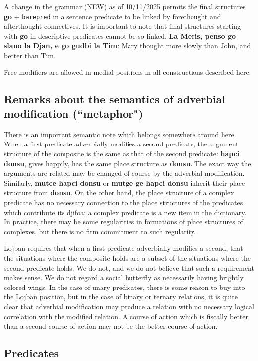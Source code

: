 \documentclass[12pt]{book}
\begin{document}
A change in the grammar (NEW) as of 10/11/2025 permits the final structures {\bf go} + {\tt barepred} in a sentence predicate to be linked by forethought and afterthought connectives.  It is important to note that final structures starting with {\bf go} in descriptive predicates cannot be so linked.  {\bf La Meris, penso go slano la Djan, e go gudbi la Tim}:  Mary thought more slowly than John, and better than Tim.

Free modifiers are allowed in medial positions in all constructions described here.

\subsection{Remarks about the semantics of adverbial modification (``metaphor")}

There is an important semantic note which belongs somewhere around here.  When a first predicate adverbially modifies a second predicate, the argument structure of the composite is the same as that of the second predicate:  {\bf hapci donsu}, gives happily, has the same place structure as {\bf donsu}.  The exact way the arguments are related may be changed of course by the adverbial modification.   Similarly, {\bf mutce hapci donsu} or {\bf mutge ge hapci donsu} inherit their place structure from {\bf donsu}.  On the other hand, the place structure of a complex predicate
has no necessary connection to the place structures of the predicates which contribute its djifoa:  a complex predicate is a new item in the dictionary.  In practice, there may be some regularities in formations of place structures of complexes, but there is no firm commitment to such regularity.

Lojban requires that when a first predicate adverbially modifies a second, that the situations where the composite holds are a subset of the situations where the  second predicate holds.  We do not, and we do not believe that such a requirement makes sense.  We do not regard a social butterfly as necessarily having brightly colored wings.  In the case of unary predicates, there is some reason to buy into the Lojban position, but in the case of binary or ternary relations, it is quite clear that adverbial modification may produce a relation with no necessary logical correlation with the modified relation.  A course of action which is fiscally better than a second course of action may not be the better course of action.

\subsection{Predicates}
\end{document}
